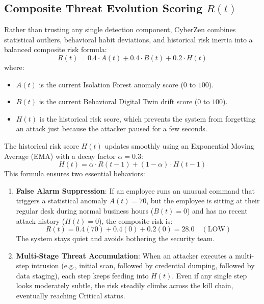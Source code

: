 \documentclass[conference]{IEEEtran}
\begin{document}
\subsection{Composite Threat Evolution Scoring $R(t)$}
Rather than trusting any single detection component, CyberZen combines statistical outliers, behavioral habit deviations, and historical risk inertia into a balanced composite risk formula:
\begin{equation}
R(t) = 0.4 \cdot A(t) + 0.4 \cdot B(t) + 0.2 \cdot H(t)
\label{eq:composite_risk}
\end{equation}
where:
\begin{itemize}
    \item $A(t)$ is the current Isolation Forest anomaly score ($0$ to $100$).
    \item $B(t)$ is the current Behavioral Digital Twin drift score ($0$ to $100$).
    \item $H(t)$ is the historical risk score, which prevents the system from forgetting an attack just because the attacker paused for a few seconds.
\end{itemize}

The historical risk score $H(t)$ updates smoothly using an Exponential Moving Average (EMA) with a decay factor $\alpha = 0.3$:
\begin{equation}
H(t) = \alpha \cdot R(t-1) + (1-\alpha) \cdot H(t-1)
\end{equation}
This formula ensures two essential behaviors:
\begin{enumerate}
    \item \textbf{False Alarm Suppression}: If an employee runs an unusual command that triggers a statistical anomaly $A(t) = 70$, but the employee is sitting at their regular desk during normal business hours ($B(t) = 0$) and has no recent attack history ($H(t) = 0$), the composite risk is:
    \[
    R(t) = 0.4(70) + 0.4(0) + 0.2(0) = 28.0 \quad (\text{LOW})
    \]
    The system stays quiet and avoids bothering the security team.
    \item \textbf{Multi-Stage Threat Accumulation}: When an attacker executes a multi-step intrusion (e.g., initial scan, followed by credential dumping, followed by data staging), each step keeps feeding into $H(t)$. Even if any single step looks moderately subtle, the risk steadily climbs across the kill chain, eventually reaching Critical status.
\end{enumerate}
\end{document}
